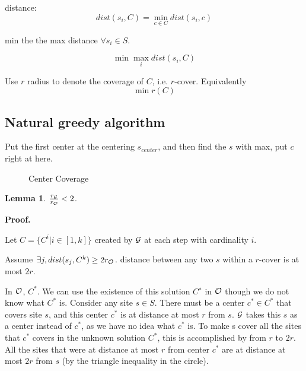 \documentclass[a4paper]{report}
\theoremstyle{definition}
\newtheorem{lem}{Lemma}[section]
\begin{document}
distance:
$$
dist(s_i, C) =\min_{c\in C} dist(s_i, c)
$$

min the the max distance $\forall s_i \in S$.

$$
\min \max_i dist(s_i, C)
$$

Use $r$ radius to denote the coverage of $C$, i.e. $r$-cover. Equivalently
$$
\min r(C)
$$
\subsection{Natural greedy algorithm}
Put the first center at the centering $s_{center}$, and then find the $s$ with max, put $c$ right at here.

\begin{figure}[!htp]
\centering
{}
\caption{Center Coverage}
\label{fig:11_4}
\end{figure}

\begin{lem}
$\frac{r_{\mathcal{G}}}{r_{\mathcal{O}}}<2$.
\end{lem}

\textbf{Proof.}

Let $C=\{C^i | i\in[1, k]\}$ created by $\mathcal{G}$ at each step with cardinality $i$.

Assume $\exists j, dist(s_j, C^k)\geq 2r_{\mathcal{O}}$. distance between any two $s$ within a $r$-cover is at most $2r$.

In $\mathcal{O}$, $C^*$. We can use the existence of this solution $C^∗$ in $\mathcal{O}$ though we do not know what $C^*$ is. Consider any site $s \in S$. There must be a center $c^* \in C^*$ that covers site $s$, and this center $c^*$ is at distance at most $r$ from $s$. $\mathcal{G}$ takes this $s$ as a center instead of $c^*$, as we have no idea what $c^*$ is. To make s cover all the sites that $c^*$ covers in the unknown solution $C^*$, this is accomplished by  from $r$ to $2r$. All the sites that were at distance at most $r$ from center $c^*$ are at distance at most $2r$ from $s$ (by the triangle inequality in the circle).
\end{document}
